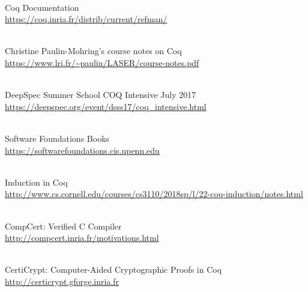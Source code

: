 \documentclass{article}
\begin{document}
~\\
Coq Documentation \\
\url{https://coq.inria.fr/distrib/current/refman/}

~\\
Christine Paulin-Mohring's course notes on Coq 	\\
\url{https://www.lri.fr/~paulin/LASER/course-notes.pdf}

~\\
DeepSpec Summer School COQ Intensive July 2017	\\
\url{https://deepspec.org/event/dsss17/coq\_intensive.html}

~\\
Software Foundations Books		\\
\url{https://softwarefoundations.cis.upenn.edu}

~\\
Induction in Coq		\\
\url{http://www.cs.cornell.edu/courses/cs3110/2018sp/l/22-coq-induction/notes.html}

~\\
CompCert: Verified C Compiler		\\
\url{http://compcert.inria.fr/motivations.html}

~\\
CertiCrypt: Computer-Aided Cryptographic Proofs in Coq		\\
\url{http://certicrypt.gforge.inria.fr}
\end{document}
